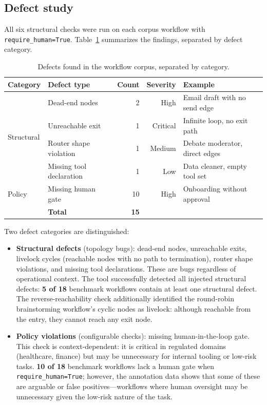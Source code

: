 \subsection{Defect study}

All six structural checks were run on each corpus workflow with
\texttt{require\_human=True}. Table~\ref{tab:defects} summarizes the
findings, separated by defect category.

\begin{table}[t]
\centering
\small
\caption{Defects found in the workflow corpus, separated by category.}
\label{tab:defects}
\begin{tabular}{@{}llrrl@{}}
\toprule
\textbf{Category} & \textbf{Defect type} & \textbf{Count} & \textbf{Severity} & \textbf{Example} \\
\midrule
\multirow{4}{*}{Structural} & Dead-end nodes & 2 & High & Email draft with no send edge \\
& Unreachable exit & 1 & Critical & Infinite loop, no exit path \\
& Router shape violation & 1 & Medium & Debate moderator, direct edges \\
& Missing tool declaration & 1 & Low & Data cleaner, empty tool set \\
\midrule
Policy & Missing human gate & 10 & High & Onboarding without approval \\
\midrule
& \textbf{Total} & \textbf{15} & & \\
\bottomrule
\end{tabular}
\end{table}

Two defect categories are distinguished:
\begin{itemize}
  \item \textbf{Structural defects} (topology bugs): dead-end nodes,
  unreachable exits, livelock cycles (reachable nodes with no path to
  termination), router shape violations, and missing tool
  declarations.  These are bugs regardless of operational context.
  The tool successfully detected all injected structural defects:
  \textbf{5 of 18} benchmark workflows contain at least one structural
  defect.  The reverse-reachability check additionally identified the
  round-robin brainstorming workflow's cyclic nodes as livelock: although
  reachable from the entry, they cannot reach any exit node.
  \item \textbf{Policy violations} (configurable checks): missing
  human-in-the-loop gate. This check is context-dependent: it is
  critical in regulated domains (healthcare, finance) but may be
  unnecessary for internal tooling or low-risk tasks.
  \textbf{10 of 18} benchmark workflows lack a human gate when
  \texttt{require\_human=True}; however, the annotation data shows that
  some of these are arguable or false positives---workflows where human
  oversight may be unnecessary given the low-risk nature of the task.
\end{itemize}

